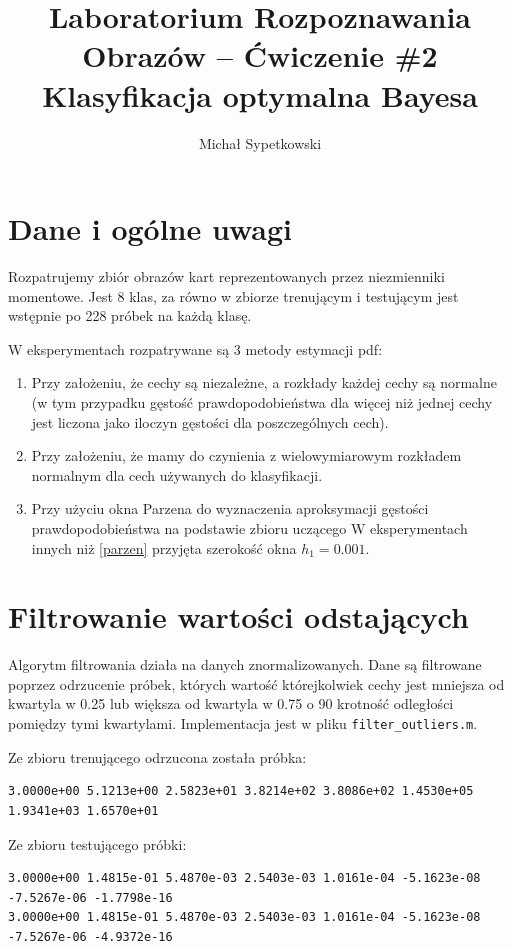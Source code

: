 \documentclass[a4paper]{article}
\begin{document}
\title{Laboratorium Rozpoznawania Obrazów – Ćwiczenie \#2 Klasyfikacja optymalna Bayesa}

\author{Michał Sypetkowski}
\maketitle


\section{Dane i ogólne uwagi}
Rozpatrujemy zbiór obrazów kart reprezentowanych przez niezmienniki momentowe.
Jest 8 klas, za równo w zbiorze trenującym i testującym jest wstępnie po 228 próbek na każdą klasę.

W eksperymentach rozpatrywane są 3 metody estymacji pdf:
\begin{enumerate}
\item Przy założeniu, że cechy są niezależne, a rozkłady każdej cechy są normalne (w tym
    przypadku gęstość prawdopodobieństwa dla więcej niż jednej cechy jest liczona jako
    iloczyn gęstości dla poszczególnych cech).
\item Przy założeniu, że mamy do czynienia z wielowymiarowym rozkładem normalnym dla cech
    używanych do klasyfikacji.
\item Przy użyciu okna Parzena do wyznaczenia aproksymacji gęstości prawdopodobieństwa na
    podstawie zbioru uczącego
    W eksperymentach innych niż \ref{parzen} przyjęta szerokość okna $h_1=0.001$.
\end{enumerate}

\section{Filtrowanie wartości odstających}
Algorytm filtrowania działa na danych znormalizowanych.
Dane są filtrowane poprzez odrzucenie próbek,
których wartość którejkolwiek cechy jest mniejsza
od kwartyla w 0.25 lub większa od kwartyla w 0.75 o 90 krotność odległości pomiędzy tymi kwartylami.
Implementacja jest w pliku \texttt{filter\_outliers.m}.

Ze zbioru trenującego odrzucona została próbka:
\begin{verbatim}
3.0000e+00 5.1213e+00 2.5823e+01 3.8214e+02 3.8086e+02 1.4530e+05 1.9341e+03 1.6570e+01
\end{verbatim}

Ze zbioru testującego próbki:
\begin{verbatim}
3.0000e+00 1.4815e-01 5.4870e-03 2.5403e-03 1.0161e-04 -5.1623e-08 -7.5267e-06 -1.7798e-16
3.0000e+00 1.4815e-01 5.4870e-03 2.5403e-03 1.0161e-04 -5.1623e-08 -7.5267e-06 -4.9372e-16
\end{verbatim}
\end{document}
